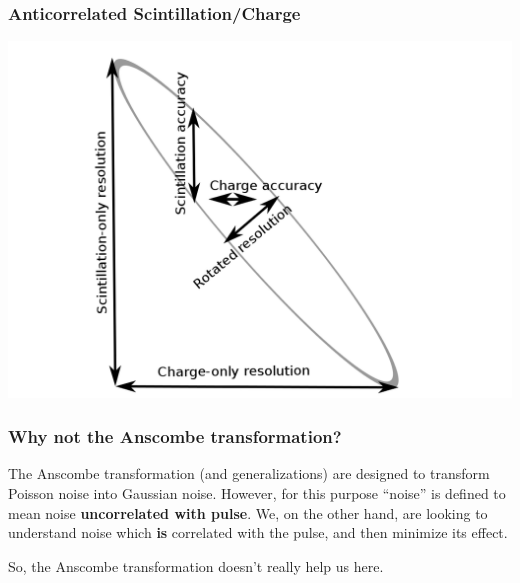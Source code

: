 \documentclass{beamer}
\begin{document}
\begin{frame}
\begin{center}
\frametitle{Anticorrelated Scintillation/Charge}
\end{center}
\vspace{.5cm}
\begin{center}
\includegraphics[keepaspectratio=true,width=\textwidth]{RotatedIsland.png}
\end{center}
\end{frame}

\begin{frame}
\begin{center}
\frametitle{Why not the Anscombe transformation?}
\end{center}
The Anscombe transformation (and generalizations) are designed to transform Poisson noise into Gaussian noise.  However, for this purpose ``noise'' is defined to mean noise {\bf uncorrelated with pulse}.  We, on the other hand, are looking to understand noise which {\bf is} correlated with the pulse, and then minimize its effect.

So, the Anscombe transformation doesn't really help us here.
\end{frame}
\end{document}
